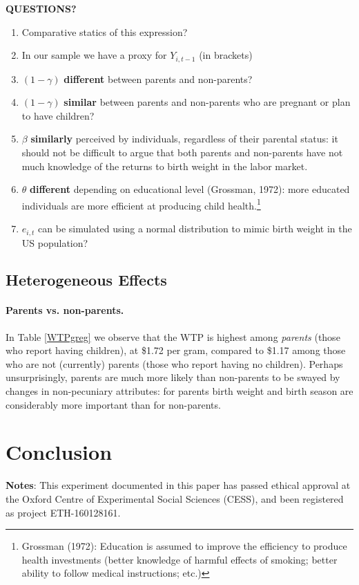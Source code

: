 \documentclass[a4paper, 11pt]{article}
\begin{document}
\begin{spacing}{1.4}
 
\textbf{QUESTIONS?}
\begin{enumerate}
  \item Comparative statics of this expression? 
  \item In our sample we have a proxy for $Y_{i,t-1}$ (in brackets)
  \item $(1-\gamma)$ \textbf{different} between parents and non-parents?
  \item $(1-\gamma)$ \textbf{similar} between parents and non-parents who are pregnant or plan to have children?
  \item $\beta$ \textbf{similarly} perceived by individuals, regardless of their parental status: it should not be difficult to argue that both parents and non-parents have not much knowledge of the returns to birth weight in the labor market.
  \item $\theta$ \textbf{different} depending on educational level (Grossman, 1972): more educated individuals are more efficient at producing child health.\footnote{Grossman (1972): Education is assumed to improve the efficiency to produce health investments (better knowledge of harmful effects of smoking; better ability to follow medical instructions; etc.)}
  \item $e_{i,t}$ can be simulated using a normal distribution to mimic birth weight in the US population?
\end{enumerate}

\subsection{Heterogeneous Effects}
\paragraph{Parents vs. non-parents.} In Table \ref{WTPgreg} we observe that the WTP is highest among \emph{parents} (those who report having children),
at \$1.72 per gram, compared to \$1.17 among those who are not (currently)
parents (those who report having no children).  Perhaps unsurprisingly, parents are much more likely than
non-parents to be swayed by changes in non-pecuniary attributes: for parents
birth weight and birth season are considerably more important than for
non-parents. %



\newpage


\section{Conclusion}
\label{scn:conclusion}

\newpage
\noindent\textbf{Notes}: This experiment documented in this paper has passed ethical approval at the Oxford Centre of Experimental Social Sciences (CESS), and been registered as project ETH-160128161.



\clearpage
\end{spacing}
\end{document}
